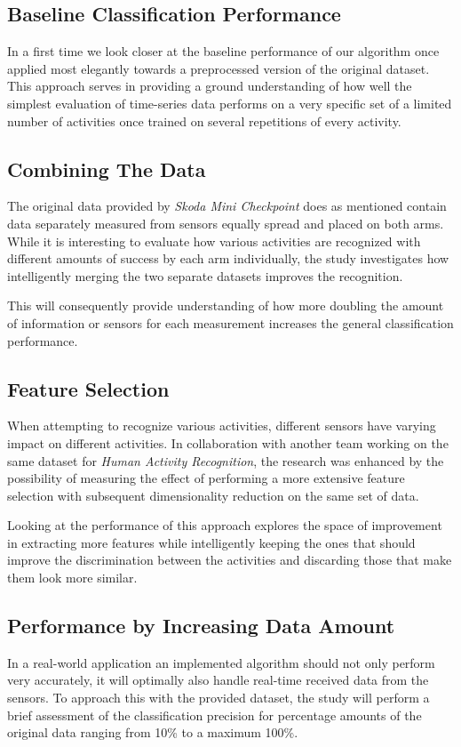 \documentclass{sig-alternate}
\begin{document}
\subsection{Baseline Classification Performance}
In a first time we look closer at the baseline performance of our algorithm once applied most elegantly towards a preprocessed version of the original dataset. This approach serves in providing a ground understanding of how well the simplest evaluation of time-series data performs on a very specific set of a limited number of activities once trained on several repetitions of every activity.

\subsection{Combining The Data}
The original data provided by \textit{Skoda Mini Checkpoint} does as mentioned contain data separately measured from sensors equally spread and placed on both arms. While it is interesting to evaluate how various activities are recognized with different amounts of success by each arm individually, the study investigates how intelligently merging the two separate datasets improves the recognition. 

This will consequently provide understanding of how more doubling the amount of information or sensors for each measurement increases the general classification performance.

\subsection{Feature Selection}
When attempting to recognize various activities, different sensors have varying impact on different activities. In collaboration with another team working on the same dataset for \textit{Human Activity Recognition}, the research was enhanced by the possibility of measuring the effect of performing a more extensive feature selection with subsequent dimensionality reduction on the same set of data. 

Looking at the performance of this approach explores the space of improvement in extracting more features while intelligently keeping the ones that should improve the discrimination between the activities and discarding those that make them look more similar.

\subsection{Performance by Increasing Data Amount}
In a real-world application an implemented algorithm should not only perform very accurately, it will optimally also handle real-time received data from the sensors. To approach this with the provided dataset, the study will perform a brief assessment of the classification precision for percentage amounts of the original data ranging from 10\% to a maximum 100\%.
\end{document}
